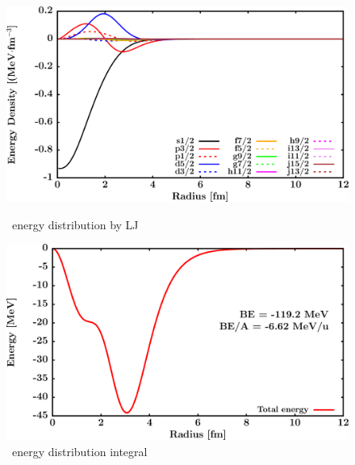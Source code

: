 \begin{figure}[hbtp]
    \centering
    \begin{minipage}{0.45\textwidth}
        \centering
        \includegraphics[width=\textwidth]{figures/o18_EnergyDist.png}
        \caption*{\oEight\ energy distribution by LJ}
        \label{DOMFitData_o18_proton_energyDistInt}
    \end{minipage}\hspace{6pt}
    \begin{minipage}{0.45\textwidth}
        \centering
        \includegraphics[width=\textwidth]{figures/o18_EnergyDistIntegral.png}
        \caption*{\oEight\ energy distribution integral}
        \label{DOMFitData_o18_neutron_energyDistInt}
    \end{minipage}
\end{figure}
\vspace{0.4in}

